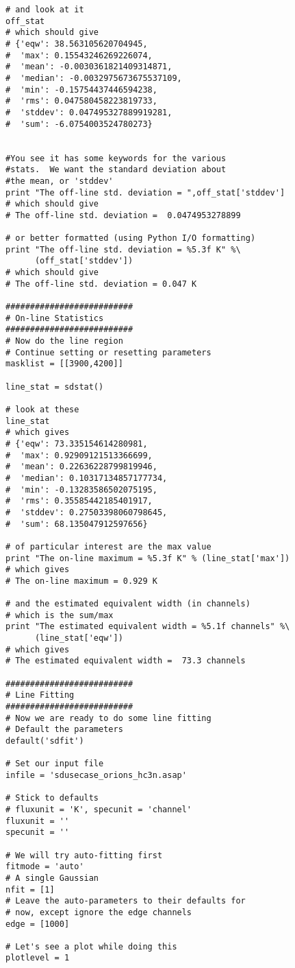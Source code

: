 \begin{verbatim}
# and look at it
off_stat
# which should give
# {'eqw': 38.563105620704945,
#  'max': 0.15543246269226074,
#  'mean': -0.0030361821409314871,
#  'median': -0.0032975673675537109,
#  'min': -0.15754437446594238,
#  'rms': 0.047580458223819733,
#  'stddev': 0.047495327889919281,
#  'sum': -6.0754003524780273}


#You see it has some keywords for the various
#stats.  We want the standard deviation about
#the mean, or 'stddev'
print "The off-line std. deviation = ",off_stat['stddev']
# which should give
# The off-line std. deviation =  0.0474953278899

# or better formatted (using Python I/O formatting)
print "The off-line std. deviation = %5.3f K" %\
      (off_stat['stddev'])
# which should give
# The off-line std. deviation = 0.047 K

##########################
# On-line Statistics
##########################
# Now do the line region
# Continue setting or resetting parameters
masklist = [[3900,4200]]

line_stat = sdstat()

# look at these
line_stat
# which gives
# {'eqw': 73.335154614280981,
#  'max': 0.92909121513366699,
#  'mean': 0.22636228799819946,
#  'median': 0.10317134857177734,
#  'min': -0.13283586502075195,
#  'rms': 0.35585442185401917,
#  'stddev': 0.27503398060798645,
#  'sum': 68.135047912597656}

# of particular interest are the max value
print "The on-line maximum = %5.3f K" % (line_stat['max'])
# which gives
# The on-line maximum = 0.929 K

# and the estimated equivalent width (in channels)
# which is the sum/max
print "The estimated equivalent width = %5.1f channels" %\
      (line_stat['eqw'])
# which gives
# The estimated equivalent width =  73.3 channels

##########################
# Line Fitting
##########################
# Now we are ready to do some line fitting
# Default the parameters
default('sdfit')

# Set our input file
infile = 'sdusecase_orions_hc3n.asap'

# Stick to defaults
# fluxunit = 'K', specunit = 'channel'
fluxunit = ''
specunit = ''

# We will try auto-fitting first
fitmode = 'auto'
# A single Gaussian
nfit = [1]
# Leave the auto-parameters to their defaults for
# now, except ignore the edge channels
edge = [1000]

# Let's see a plot while doing this
plotlevel = 1


\end{verbatim}
